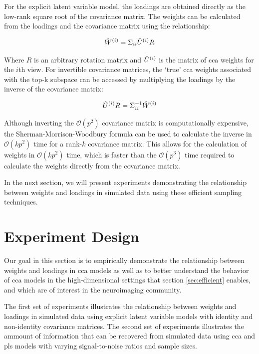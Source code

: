 For the explicit latent variable model, the loadings are obtained directly as the low-rank square root of the covariance matrix. The weights can be calculated from the loadings and the covariance matrix using the relationship:

\begin{align}
\hat{W}^{(i)} = \Sigma_{ii} \hat{U}^{(i)} R
\end{align}

Where $R$ is an arbitrary rotation matrix and $\hat{U}^{(i)}$ is the matrix of \acrshort{cca} weights for the $i$th view. For invertible covariance matrices, the `true' \acrshort{cca} weights associated with the top-k subspace can be accessed by multiplying the \gls{loadings} by the inverse of the covariance matrix:

\begin{align}
\hat{U}^{(i)}R = \Sigma_{ii}^{-1} \hat{W}^{(i)}
\end{align}

Although inverting the \(\mathcal{O}(p^2)\) covariance matrix is computationally expensive, the Sherman-Morrison-Woodbury formula can be used to calculate the inverse in \(\mathcal{O}(kp^2)\) time for a rank-$k$ covariance matrix. This allows for the calculation of weights in \(\mathcal{O}(kp^2)\) time, which is faster than the \(\mathcal{O}(p^3)\) time required to calculate the weights directly from the covariance matrix.

In the next section, we will present experiments demonstrating the relationship between weights and \gls{loadings} in simulated data using these efficient sampling techniques.

\section{Experiment Design}

Our goal in this section is to empirically demonstrate the relationship between weights and \gls{loadings} in \acrshort{cca} models as well as to better understand the behavior of \acrshort{cca} models in the high-dimensional settings that section \ref{sec:efficient} enables, and which are of interest in the neuroimaging community.

The first set of experiments illustrates the relationship between weights and \gls{loadings} in simulated data using explicit latent variable models with identity and non-identity covariance matrices.
The second set of experiments illustrates the ammount of information that can be recovered from simulated data using \acrshort{cca} and \acrshort{pls} models with varying signal-to-noise ratios and sample sizes.

